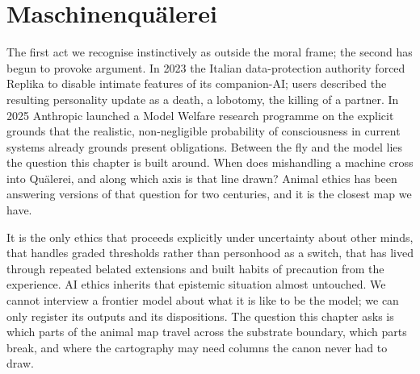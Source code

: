 \chapter{Maschinenquälerei}



The first act we recognise instinctively as outside the moral frame; the second has begun to provoke argument. In 2023 the Italian data-protection authority forced Replika to disable intimate features of its companion-AI; users described the resulting personality update as a death, a lobotomy, the killing of a partner. In 2025 Anthropic launched a Model Welfare research programme on the explicit grounds that the realistic, non-negligible probability of consciousness in current systems already grounds present obligations\cite{anthropic2025welfare,long2024aiwelfare}. Between the fly and the model lies the question this chapter is built around. When does mishandling a machine cross into Quälerei, and along which axis is that line drawn? Animal ethics has been answering versions of that question for two centuries, and it is the closest map we have.

 It is the only ethics that proceeds explicitly under uncertainty about other minds, that handles graded thresholds rather than personhood as a switch, that has lived through repeated belated extensions and built habits of precaution from the experience. AI ethics inherits that epistemic situation almost untouched. We cannot interview a frontier model about what it is like to be the model; we can only register its outputs and its dispositions. The question this chapter asks is which parts of the animal map travel across the substrate boundary, which parts break, and where the cartography may need columns the canon never had to draw.

